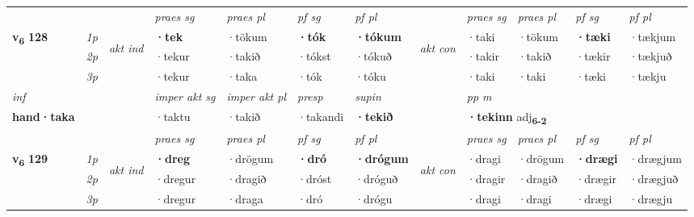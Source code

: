 \begin{longtable}[l]{X>{\footnotesize\itshape}llXXXXlXXXX}
 & &   & \textit{praes sg}  & \textit{praes pl}    & \textit{ pf sg} & \textit{pf pl} & & \textit{praes sg}  & \textit{praes pl}    & \textit{pf sg} & \textit{pf pl }  \\ \cmidrule{4-7} \cmidrule{9-12}
 \multirow{2}{*}{{{\textbf{v{\textsubscript{6}}} \Large{\textbf{128}}}}}  & 1p & \multirow{3}{*}{\begin{turn}{90}\textit{akt ind}\end{turn}} & \textbf{·tek} & ·tökum & \textbf{·tók} & \textbf{·tókum} & \multirow{3}{*}{\begin{turn}{90}\textit{akt con}\end{turn}} &·taki & ·tökum & \textbf{·tæki} & ·tækjum\\*
 & 2p &  &  ·tekur  & ·takið & ·tókst & ·tókuð & & ·takir & ·takið & ·tækir & ·tækjuð \\*
 & 3p &  & ·tekur & ·taka & ·tók & ·tóku & & ·taki & ·taki& ·tæki & ·tækju \\*
\cmidrule{4-7} \cmidrule{9-12}

   {\textit{inf}} & &  & \textit{imper akt sg} & \textit{imper akt pl}   & \textit{presp} & \textit{supin}  && \textit{pp m} \\*
  {\textbf{hand\allowbreak ·taka}} & && ·taktu  & ·takið   & ·takandi &  \textbf{·tekið}  && \multicolumn{2}{l}{\textbf{·tekinn} adj\textbf{\textsubscript{6-2}}} \\*

\midrule

 \midrule
 & &   & \textit{praes sg}  & \textit{praes pl}    & \textit{ pf sg} & \textit{pf pl} & & \textit{praes sg}  & \textit{praes pl}    & \textit{pf sg} & \textit{pf pl }  \\ \cmidrule{4-7} \cmidrule{9-12}
 \multirow{2}{*}{{{\textbf{v{\textsubscript{6}}} \Large{\textbf{129}}}}}  & 1p & \multirow{3}{*}{\begin{turn}{90}\textit{akt ind}\end{turn}} & \textbf{·dreg} & ·drögum & \textbf{·dró} & \textbf{·drógum} & \multirow{3}{*}{\begin{turn}{90}\textit{akt con}\end{turn}} &·dragi & ·drögum & \textbf{·drægi} & ·drægjum\\*
 & 2p &  &  ·dregur  & ·dragið & ·dróst & ·dróguð & & ·dragir & ·dragið & ·drægir & ·drægjuð \\*
 & 3p &  & ·dregur & ·draga & ·dró & ·drógu & & ·dragi & ·dragi& ·drægi & ·drægju \\*
\cmidrule{4-7} \cmidrule{9-12}


\end{longtable}
